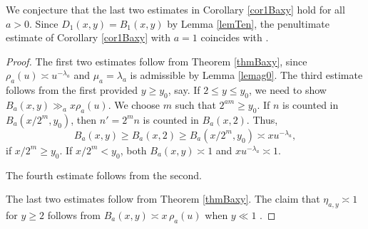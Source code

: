 \documentclass[11pt]{amsart}
\begin{document}
We conjecture that the last two estimates in Corollary \ref{cor1Baxy} hold for all $a>0$.
Since $D_1(x,y)=B_1(x,y)$ by Lemma \ref{lemTen}, the penultimate estimate of Corollary \ref{cor1Baxy} with $a=1$ coincides with \cite[Thm. 1.3]{PDD}.



\begin{proof}
The first two estimates follow from Theorem \ref{thmBaxy}, since $\rho_a(u)\asymp u^{-\lambda_a}$ and $\mu_a=\lambda_a$ is admissible 
by Lemma \ref{lemag0}. 
The third estimate follows from the first provided $y\ge y_0$, say.
If $2 \le y \le y_0$, we need to show $B_a(x,y) \gg_a x \rho_a(u)$.
We choose $m$ such that $2^{am}\ge y_0$. If $n$ is counted in $B_a(x/2^m, y_0)$, then $n'=2^m n$ is counted in $B_a(x,2)$.
Thus,
\begin{equation*}
B_a(x,y) \ge B_a(x,2) \ge B_a(x/2^m, y_0) \asymp x u^{-\lambda_a},
\end{equation*}
if $x/2^m \ge y_0$.
If $x/2^m < y_0$, both $B_a(x,y) \asymp 1$ and $x u^{-\lambda_a} \asymp 1$. 

The fourth estimate follows from the second.

The last two estimates follow from Theorem \ref{thmBaxy}. The claim that $\eta_{a,y} \asymp 1$ for $y\ge 2$ follows from $B_a(x,y) \asymp x \, \rho_a(u)$
when $y\ll 1$ .
\end{proof}
\end{document}
